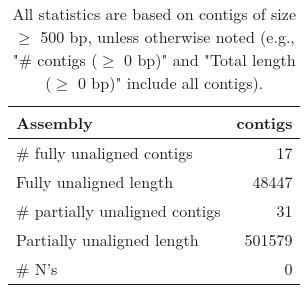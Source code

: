 \documentclass[12pt,a4paper]{article}
\begin{document}
\begin{table}[ht]
\begin{center}
\caption{All statistics are based on contigs of size $\geq$ 500 bp, unless otherwise noted (e.g., "\# contigs ($\geq$ 0 bp)" and "Total length ($\geq$ 0 bp)" include all contigs).}
\begin{tabular}{|l*{1}{|r}|}
\hline
Assembly & contigs \\ \hline
\# fully unaligned contigs & 17 \\ \hline
Fully unaligned length & 48447 \\ \hline
\# partially unaligned contigs & 31 \\ \hline
Partially unaligned length & 501579 \\ \hline
\# N's & 0 \\ \hline
\end{tabular}
\end{center}
\end{table}
\end{document}
